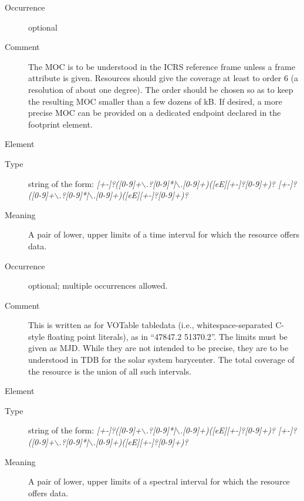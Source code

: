 \documentclass[11pt,a4paper]{ivoa}
\begin{document}
\begin{generated}
\begin{bigdescription}
\begin{description}
\item[Occurrence] optional
\item[Comment]
                  The MOC is to be understood in the ICRS reference frame
                  unless a frame attribute is given.
                  Resources should give the coverage at least to order 6
                  (a resolution of about one degree).  The order should be
                  chosen so as to keep the resulting MOC smaller than a few
                  dozens of kB.  If desired, a more precise MOC can be provided
                  on a dedicated endpoint declared in the footprint element.


\end{description}
\item[Element \xmlel{temporal}]
\begin{description}
\item[Type] string of the form: \emph{[+-]?([0-9]+$\backslash$.?[0-9]*|$\backslash$.[0-9]+)([eE][+-]?[0-9]+)? [+-]?([0-9]+$\backslash$.?[0-9]*|$\backslash$.[0-9]+)([eE][+-]?[0-9]+)?}
\item[Meaning]
                  A pair of lower, upper limits of a time interval
                  for which the resource offers data.

\item[Occurrence] optional; multiple occurrences allowed.

\item[Comment]
                  This is written as for VOTable tabledata (i.e.,
                  whitespace-separated C-style floating point literals), as
                  in “47847.2 51370.2”.
                  The limits must be given as MJD.  While they
                  are not intended to be precise, they are to be understood
                  in TDB for the solar system barycenter.  The total coverage
                  of the resource is the union of all such intervals.


\end{description}
\item[Element \xmlel{spectral}]
\begin{description}
\item[Type] string of the form: \emph{[+-]?([0-9]+$\backslash$.?[0-9]*|$\backslash$.[0-9]+)([eE][+-]?[0-9]+)? [+-]?([0-9]+$\backslash$.?[0-9]*|$\backslash$.[0-9]+)([eE][+-]?[0-9]+)?}
\item[Meaning]
                  A pair of lower, upper limits of a spectral interval
                  for which the resource offers data.


\end{description}
\end{bigdescription}
\end{generated}
\end{document}

